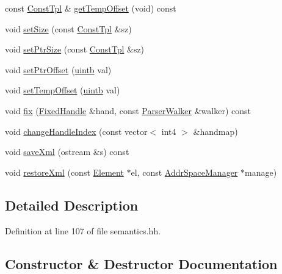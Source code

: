 \begin{DoxyCompactItemize}
\item 
const \mbox{\hyperlink{class_const_tpl}{Const\+Tpl}} \& \mbox{\hyperlink{class_handle_tpl_affc924ba1240b7dcd0df72398e34d85d}{get\+Temp\+Offset}} (void) const
\item 
void \mbox{\hyperlink{class_handle_tpl_af6e14547c5db9f9ca16f86756e020a1d}{set\+Size}} (const \mbox{\hyperlink{class_const_tpl}{Const\+Tpl}} \&sz)
\item 
void \mbox{\hyperlink{class_handle_tpl_a81fee0c1a82ff4abc4735f7dc8f22e0a}{set\+Ptr\+Size}} (const \mbox{\hyperlink{class_const_tpl}{Const\+Tpl}} \&sz)
\item 
void \mbox{\hyperlink{class_handle_tpl_a6771a49d39c41a4ca2e1eabba1a1b28a}{set\+Ptr\+Offset}} (\mbox{\hyperlink{types_8h_a2db313c5d32a12b01d26ac9b3bca178f}{uintb}} val)
\item 
void \mbox{\hyperlink{class_handle_tpl_abfcb8475255773b9fec8a682aa1b85e0}{set\+Temp\+Offset}} (\mbox{\hyperlink{types_8h_a2db313c5d32a12b01d26ac9b3bca178f}{uintb}} val)
\item 
void \mbox{\hyperlink{class_handle_tpl_ad63a0ce0388c46af005d036efc20758f}{fix}} (\mbox{\hyperlink{struct_fixed_handle}{Fixed\+Handle}} \&hand, const \mbox{\hyperlink{class_parser_walker}{Parser\+Walker}} \&walker) const
\item 
void \mbox{\hyperlink{class_handle_tpl_acb53d25d53479eff5c054f16a023c2b2}{change\+Handle\+Index}} (const vector$<$ int4 $>$ \&handmap)
\item 
void \mbox{\hyperlink{class_handle_tpl_aee0b4e635198cb82374e925c6b7c9475}{save\+Xml}} (ostream \&s) const
\item 
void \mbox{\hyperlink{class_handle_tpl_a6dbad0fa7a1f102c7cc70763932c9b67}{restore\+Xml}} (const \mbox{\hyperlink{class_element}{Element}} $\ast$el, const \mbox{\hyperlink{class_addr_space_manager}{Addr\+Space\+Manager}} $\ast$manage)
\end{DoxyCompactItemize}


\subsection{Detailed Description}


Definition at line 107 of file semantics.\+hh.



\subsection{Constructor \& Destructor Documentation}
\mbox{\label{class_handle_tpl_a5bdfda6439b205a43f905a48e171068f}} 
